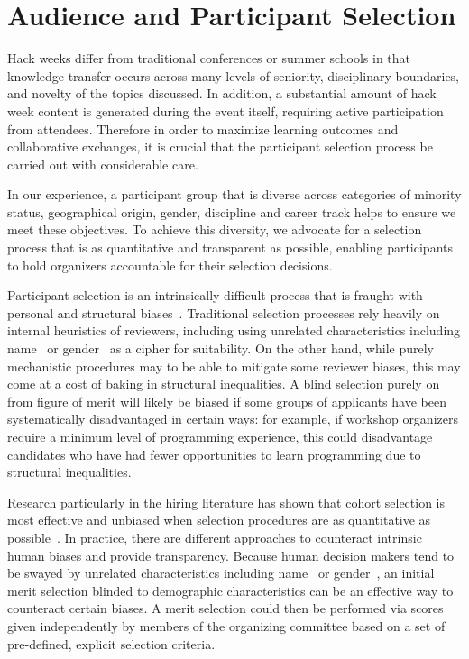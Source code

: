 \section*{Audience and Participant Selection}

Hack weeks differ from traditional conferences or summer schools in that knowledge transfer occurs across many levels of seniority, disciplinary boundaries, and novelty of the topics discussed.
In addition, a substantial amount of hack week content is generated during the event itself, requiring active participation from attendees.
Therefore in order to maximize learning outcomes and collaborative exchanges, it is crucial that the participant selection process be carried out with considerable care.

In our experience, a participant group that is diverse across categories of minority status, geographical origin, gender, discipline and career track helps to ensure we meet these objectives.
To achieve this diversity, we advocate for a selection process that is as quantitative and transparent as possible, enabling participants to hold organizers accountable for their selection decisions.

Participant selection is an intrinsically difficult process that is fraught with personal and structural biases~\cite[e.g.][]{sunstein2015wiser}. Traditional selection processes rely heavily on internal heuristics of reviewers, including using unrelated characteristics including name~\cite{bertrand2004} or gender~\cite{mossracusin2012} as a cipher for suitability. On the other hand, while purely mechanistic procedures may to be able to mitigate some reviewer biases, this may come at a cost of baking in structural inequalities. A blind selection purely on from figure of merit will likely be biased if some groups of applicants have been systematically disadvantaged in certain ways: for example, if workshop organizers require a minimum level of programming experience, this could disadvantage candidates who have had fewer opportunities to learn programming due to structural inequalities. 

Research particularly in the hiring literature has shown that cohort selection is most effective and unbiased when selection procedures are as quantitative as possible~\cite{sunstein2015wiser}. 
In practice, there are different approaches to counteract intrinsic human biases and provide transparency. 
Because human decision makers tend to be swayed by unrelated characteristics including name~\cite{bertrand2004} or gender~\cite{mossracusin2012}, an initial merit selection blinded to demographic characteristics can be an effective way to counteract certain biases. A merit selection could then be performed via scores given independently by members of the organizing committee based on a set of pre-defined, explicit selection criteria. 

